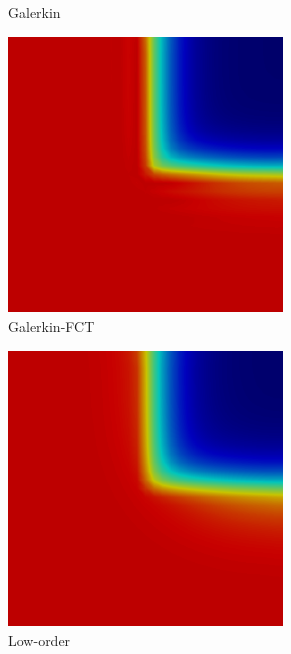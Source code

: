 \begin{frame}
\begin{figure}[h]
\begin{subfigure}{0.3\textwidth}
      \caption{Galerkin}
   \end{subfigure}
   \begin{subfigure}{0.3\textwidth}
      \centering
      \includegraphics[width=0.8\textwidth]{./figures/skew_GalFCT.png}
      \caption{Galerkin-FCT}
   \end{subfigure}
   \begin{subfigure}{0.3\textwidth}
      \centering
      \includegraphics[width=0.8\textwidth]{./figures/skew_low.png}
      \caption{Low-order}
   \end{subfigure}
   \begin{subfigure}{0.3\textwidth}

\end{subfigure}
\end{figure}
\end{frame}
